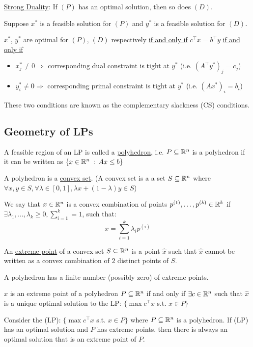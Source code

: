 \underline{Strong Duality}:
If $(P)$ has an optimal solution, then so does $(D)$.

Suppose $x^*$ is a feasible solution for $(P)$ and $y^*$ is a feasible solution for $(D)$. 

$x^*$, $y^*$ are optimal for $(P)$, $(D)$ respectively \underline{if and only if} $c^\intercal x = b^\intercal y$  \underline{if and only if}
\begin{itemize}
    \item $x^*_j \neq 0 \Rightarrow$ corresponding dual constraint is tight at $y^*$ (i.e. $(A^\intercal y^*)_j = c_j$)
    \item $y^*_i \neq 0 \Rightarrow$ corresponding primal constraint is tight at $y^*$ (i.e. $(Ax^*)_i = b_i$)
\end{itemize}
These two conditions are known as the complementary slackness (CS) conditions.

\subsection{Geometry of LPs}

A feasible region of an LP is called a \underline{polyhedron}, i.e. $P \subseteq \mathbb{R}^n$ is a polyhedron if it can be written as $\{x \in \mathbb{R}^n \::\: Ax \leq b \}$

A polyhedron is a \underline{convex set}. (A convex set is a a set $S \subseteq \mathbb{R}^n$ where $\forall x,y \in S, \forall \lambda \in [0,1], \lambda x + (1 - \lambda)y \in S$)

We say that $x \in \mathbb{R}^n$ is a convex combination of points $p^{(1)}, \ldots, p^{(k)} \in \mathbb{R}^k$ if $\exists \lambda_1, \ldots, \lambda_k \geq 0, \sum_{i = 1}^k = 1$, such that:
\begin{equation*}
    x = \sum_{i=1}^k \lambda_i p^{(i)}
\end{equation*}

An \underline{extreme point} of a convex set $S \subseteq \mathbb{R}^n$ is a point $\hat{x}$ such that $\hat{x}$ cannot be written as a convex combination of $2$ distinct points of $S$.

A polyhedron has a finite number (possibly zero) of extreme points.

$\hat{x}$ is an extreme point of a polyhedron $P \subseteq \mathbb{R}^n$ if and only if $\exists c \in \mathbb{R}^n$ such that $\hat{x}$ is a unique optimal solution to the LP: $\{\max c^\intercal x$ s.t. $x \in P\}$

\begin{theorem}{}{}
    Consider the (LP): $\{\max c^\intercal x$ s.t. $x \in P\}$ where $P \subseteq \mathbb{R}^n$ is a polyhedron. If (LP) has an optimal solution and $P$ has extreme points, then there is always an optimal solution that is an extreme point of $P$.
\end{theorem}

